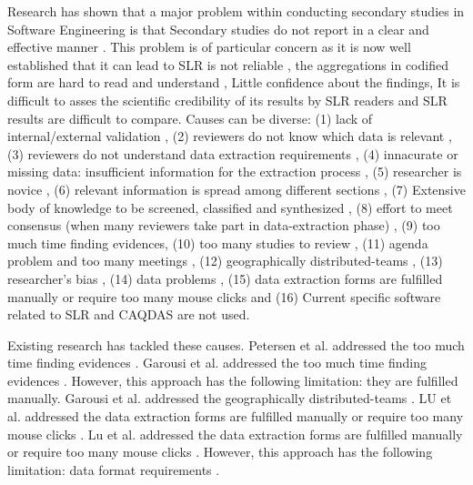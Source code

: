 \documentclass{article}
\begin{document}
Research has shown that a major problem within conducting secondary studies in Software Engineering is that Secondary studies do not report in a clear and effective manner \cite{Budgen2018} \cite{Budgen2018}. This problem is of particular concern as it is now well established that it can lead to SLR is not reliable \cite{Garousi2017} \cite{Wohlin2013}, the aggregations in codified form are hard to read and understand \cite{Dieste2008}, Little confidence about the findings, It is difficult to asses the scientific credibility of its results by SLR  readers and SLR results are difficult to compare. Causes can be diverse: (1) lack of internal/external validation \cite{Ampatzoglou2019}, (2) reviewers do not know which data is relevant \cite{Brereton2011}, (3) reviewers do not understand data extraction requirements \cite{Brereton2007} \cite{Zhou2017}, (4) innacurate or missing data: insufficient information for the extraction process \cite{Zhou2017}, (5) researcher is novice \cite{Ribeiro2018} \cite{Carver2013}, (6) relevant information is spread among different sections \cite{Budgen2018} \cite{Budgen2018}, (7) Extensive body of knowledge to be screened, classified and synthesized \cite{link.springer.com}, (8) effort to meet consensus (when many reviewers take part in data-extraction phase) \cite{Ribeiro2018} \cite{Riaz2010} \cite{Brereton2007} \cite{Staples2007} \cite{Bandara2015}, (9) too much time finding evidences, (10) too many studies to review \cite{Garousi2017}, (11) agenda problem and too many meetings \cite{Staples2007} \cite{Staples2007}, (12) geographically distributed-teams \cite{Riaz2010}, (13) researcher's bias \cite{Imtiaz2013} \cite{Ribeiro2018} \cite{Zhou2017} \cite{Zhou2017}, (14) data problems \cite{Bandara2015}, (15) data extraction forms are fulfilled manually or require too many mouse clicks \cite{Staples2007} \cite{Ramezani2017} \cite{Ramezani2017} \cite{Bandara2015} \cite{LU2008} and (16) Current specific software related to SLR and CAQDAS are not used. 
    
Existing research has tackled these causes. Petersen et al. addressed the too much time finding evidences \cite{Petersen2015}. Garousi et al. addressed the too much time finding evidences \cite{Garousi2017}. However, this approach has the following limitation: they are fulfilled manually. Garousi et al. addressed the geographically distributed-teams \cite{Garousi2017}. LU et al. addressed the data extraction forms are fulfilled manually or require too many mouse clicks \cite{LU2008}. Lu et al. addressed the data extraction forms are fulfilled manually or require too many mouse clicks \cite{Lu2008}. However, this approach has the following limitation: data format requirements \cite{Lu2008}. 
    
\end{document}
